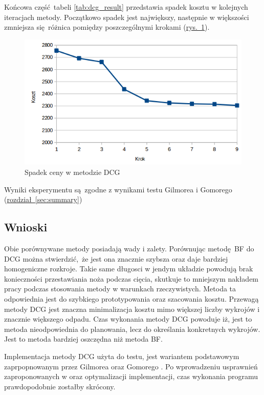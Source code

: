 Końcowa część tabeli \ref{tab:dcg_result} przedstawia spadek kosztu w kolejnych iteracjach metody. Początkowo spadek jest największy, następnie w większości zmniejsza się różnica pomiędzy poszczególnymi krokami (\hyperref[fig:regression]{rys.~\ref*{fig:regression}}).

\begin{figure}[h]
  \includegraphics[width=\textwidth]{../image/dcg_regression.png}
  \caption{Spadek ceny w metodzie DCG}
  \label{fig:regression}
\end{figure}

Wyniki eksperymentu są zgodne z wynikami testu Gilmorea i Gomorego (\hyperref[sec:dcg]{rozdział~\ref*{sec:summary}})

\subsection{Wnioski}
Obie porównywane metody posiadają wady i zalety. Porównując metodę BF do DCG można stwierdzić, że jest ona znacznie szybsza oraz daje bardziej homogeniczne rozkroje. Takie same długosci w jendym układzie powodują brak konieczności przestawiania noża podczas cięcia, skutkuje to mniejszym nakładem pracy podczas stosowania metody w warunkach rzeczywistych. Metoda ta odpowiednia jest do szybkiego prototypowania oraz szacowania kosztu. Przewagą metody DCG jest znaczna minimalizacja kosztu mimo większej liczby wykrojów i znacznie większego odpadu. Czas wykonania metody DCG powoduje iż, jest to metoda nieodpowiednia do planowania, lecz do określania konkretnych wykrojów. Jest to metoda bardziej oszczędna niż metoda BF.

Implementacja metody DCG użyta do testu, jest wariantem podstawowym zaprpopnowanym przez Gilmorea oraz Gomorego \cite{GilmoreGomoryV1Article}. Po wprowadzeniu usprawnień zaproponowanych w \cite{GilmoreGomoryV2Article} oraz optymalizacji implementacji, czas wykonania programu prawdopodobnie zostałby skrócony.
